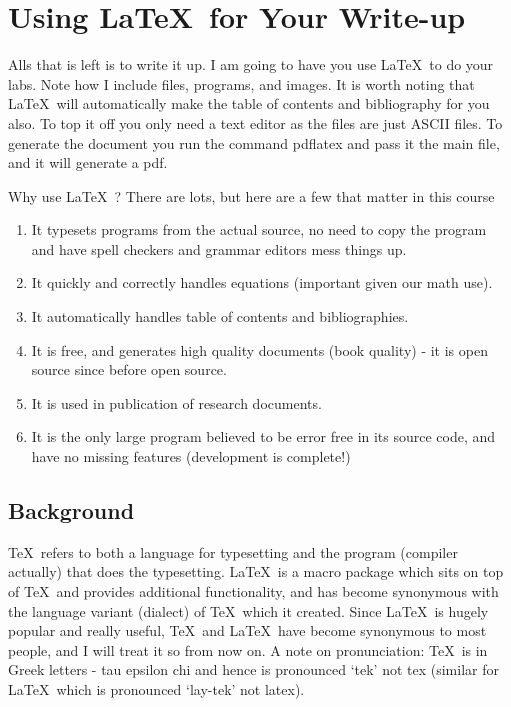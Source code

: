 \section{Using \LaTeX\ for Your Write-up}

Alls that is left is to write it up.  I am going to have you use \LaTeX\ to do your labs. Note how I include files, programs, and images.  It is worth noting that \LaTeX\ will automatically make the table of contents and bibliography for you also.  To top it off you only need a text editor as the files are just ASCII files.  To generate the document you run the command pdflatex and pass it the main file, and it will generate a pdf.

Why use \LaTeX\ ?  There are lots, but here are a few that matter in this course
\begin{enumerate}
\item It typesets programs from the actual source, no need to copy the program and have spell checkers and grammar editors mess things up.
\item It quickly and correctly handles equations (important given our math use).
\item It automatically handles table of contents and bibliographies.
\item It is free, and generates high quality documents (book quality) - it is open source since before open source.
\item It is used in publication of research documents.
\item It is the only large program believed to be error free in its source code, and have no missing features (development is complete!)
\end{enumerate}


\subsection{Background}

\TeX\ refers to both a language for typesetting and the program (compiler actually) that does the typesetting.  \LaTeX\ is a macro package which sits on top of \TeX\ and provides additional functionality, and has become synonymous with the language variant (dialect) of \TeX\ which it created.  Since \LaTeX\ is hugely popular and really useful, \TeX\ and \LaTeX\ have become synonymous to most people, and I will treat it so from now on.  A note on pronunciation: \TeX\ is in Greek letters - tau epsilon chi and hence is pronounced `tek' not tex (similar for \LaTeX\, which is pronounced `lay-tek' not latex).

